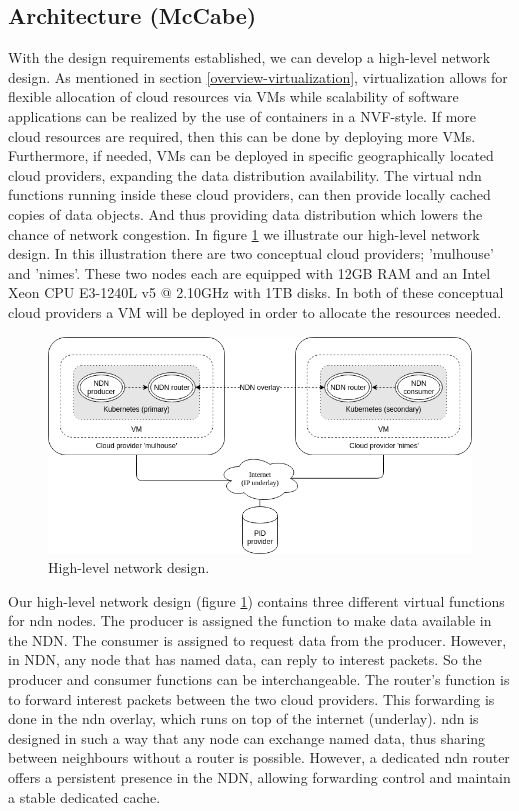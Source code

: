 \subsection{Architecture (McCabe)}
\label{planning-architecture}
With the design requirements established, we can develop a high-level network design. As mentioned in section \ref{overview-virtualization}, virtualization allows for flexible allocation of cloud resources via VMs while scalability of software applications can be realized by the use of containers in a NVF-style. If more cloud resources are required, then this can be done by deploying more VMs. Furthermore, if needed, VMs can be deployed in specific geographically located cloud providers, expanding the data distribution availability. The virtual \gls{ndn} functions running inside these cloud providers, can then provide locally cached copies of data objects. And thus providing data distribution which lowers the chance of network congestion. In figure \ref{fig:high-level-network-design} we illustrate our high-level network design. In this illustration there are two conceptual cloud providers; 'mulhouse' and 'nimes'. These two nodes each are equipped with 12GB RAM and an Intel Xeon CPU E3-1240L v5 @ 2.10GHz with 1TB disks. In both of these conceptual cloud providers a VM will be deployed in order to allocate the resources needed.

\begin{figure}[H]
\centering
\includegraphics[width=\columnwidth]{Images/high-level-network-design.png}
\caption{High-level network design.}
\label{fig:high-level-network-design}
\end{figure}

Our high-level network design (figure \ref{fig:high-level-network-design}) contains three different virtual functions for \gls{ndn} nodes. The producer is assigned the function to make data available in the NDN. The consumer is assigned to request data from the producer. However, in NDN, any node that has named data, can reply to interest packets. So the producer and consumer functions can be interchangeable. The router's function is to forward interest packets between the two cloud providers. This forwarding is done in the \gls{ndn} overlay, which runs on top of the internet (underlay). \gls{ndn} is designed in such a way that any node can exchange named data, thus sharing between neighbours without a router is possible. However, a dedicated \gls{ndn} router offers a persistent presence in the NDN, allowing forwarding control and maintain a stable dedicated cache.

